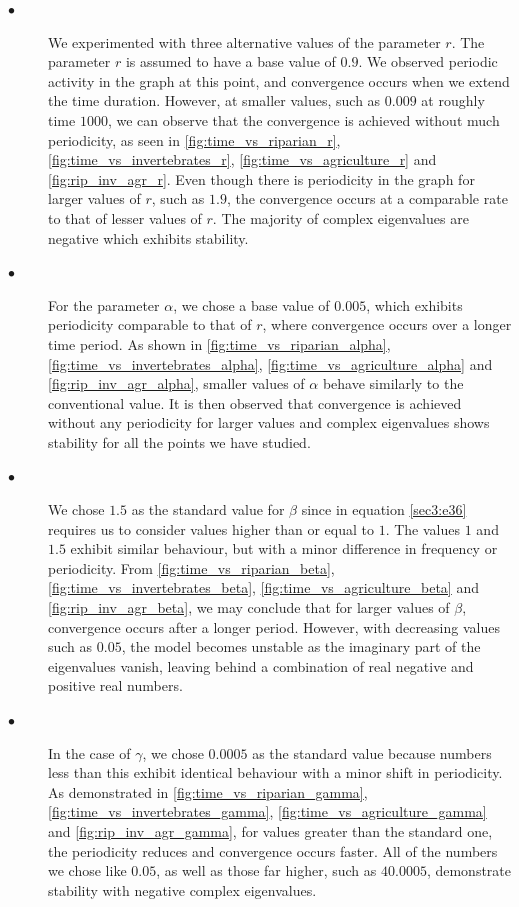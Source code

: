 \documentclass[12pt]{article}
\numberwithin{equation}{section}
\begin{document}
\begin{description}
\item[$\bullet$] We experimented with three alternative values of the parameter $r$. The parameter $r$ is assumed to have a base value of $0.9$. We observed periodic activity in the graph at this point, and convergence occurs when we extend the time duration. However, at smaller values, such as $0.009$ at roughly time $1000$, we can observe that the convergence is achieved without much periodicity, as seen in \cref{fig:time_vs_riparian_r}, \cref{fig:time_vs_invertebrates_r}, \cref{fig:time_vs_agriculture_r} and \cref{fig:rip_inv_agr_r}. Even though there is periodicity in the graph for larger values of $r$, such as $1.9$, the convergence occurs at a comparable rate to that of lesser values of $r$. The majority of complex eigenvalues are negative which exhibits stability.\\
\item[$\bullet$] For the parameter $\alpha$, we chose a base value of $0.005$, which exhibits periodicity comparable to that of $r$, where convergence occurs over a longer time period. As shown in  \cref{fig:time_vs_riparian_alpha}, \cref{fig:time_vs_invertebrates_alpha}, \cref{fig:time_vs_agriculture_alpha} and \cref{fig:rip_inv_agr_alpha}, smaller values of $\alpha$ behave similarly to the conventional value. It is then observed that convergence is achieved without any periodicity for larger values and complex eigenvalues shows stability for all the points we have studied.\\
\item[$\bullet$] We chose $1.5$ as the standard value for $\beta$ since in equation \eqref{sec3:e36} requires us to consider values higher than or equal to $1$. The values $1$ and $1.5$ exhibit similar behaviour, but with a minor difference in frequency or periodicity. From \cref{fig:time_vs_riparian_beta}, \cref{fig:time_vs_invertebrates_beta}, \cref{fig:time_vs_agriculture_beta} and \cref{fig:rip_inv_agr_beta}, we may conclude that for larger values of $\beta$, convergence occurs after a longer period. However, with decreasing values such as $0.05$, the model becomes unstable as the imaginary part of the eigenvalues vanish, leaving behind a combination of real negative and positive real numbers.\\
\item[$\bullet$] In the case of $\gamma$, we chose $0.0005$ as the standard value because numbers less than this exhibit identical behaviour with a minor shift in periodicity. As demonstrated in \cref{fig:time_vs_riparian_gamma}, \cref{fig:time_vs_invertebrates_gamma}, \cref{fig:time_vs_agriculture_gamma} and \cref{fig:rip_inv_agr_gamma}, for values greater than the standard one, the periodicity reduces and convergence occurs faster. All of the numbers we chose like $0.05$, as well as those far higher, such as $40.0005$, demonstrate stability with negative complex eigenvalues.\\

\end{description}
\end{document}

